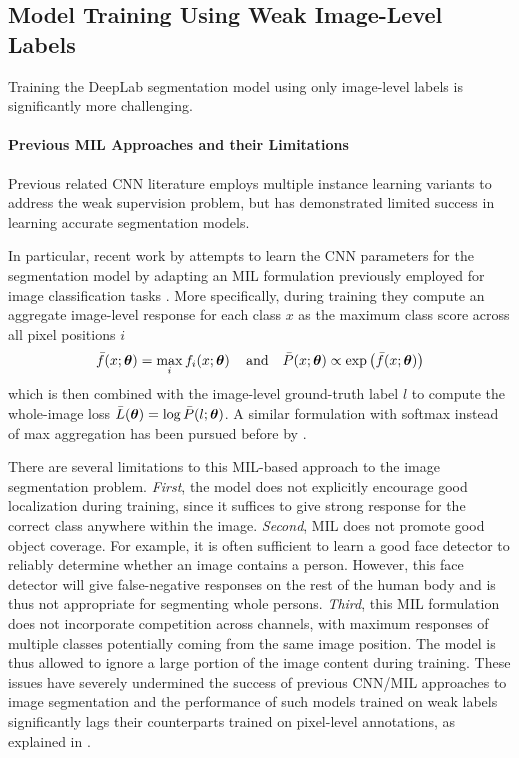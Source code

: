 \subsection{Model Training Using Weak Image-Level Labels}
\label{sec:train_image}

Training the DeepLab segmentation model using only image-level labels
is significantly more challenging.

\paragraph{Previous MIL Approaches and their Limitations}

Previous related CNN literature employs multiple instance learning
variants to address the weak supervision problem, but has demonstrated
limited success in learning accurate segmentation models. 

In particular, recent work by \citet{pathak2014fully} attempts to
learn the CNN parameters for the segmentation model by adapting an MIL
formulation previously employed for image classification tasks
\citep{oquab2014weakly, papandreou2014untangling}. More specifically,
during training they compute an aggregate image-level response for
each class $x$ as the maximum class score across all pixel positions
$i$
\begin{equation}
  \label{eq:mil}
  \bar{f}(x; \boldsymbol{\theta}) = \max_i f_i(x; \boldsymbol{\theta}) \,
  \quad \mathrm{and} \quad
  \bar{P}(x; \boldsymbol{\theta}) \propto \exp \left( \bar{f}(x; \boldsymbol{\theta}) \right)
\end{equation}
which is then combined with the image-level ground-truth label $l$ to
compute the whole-image loss $\bar{L}(\boldsymbol{\theta}) = \log \bar{P}(l;
\boldsymbol{\theta})$. A similar formulation with softmax instead of max
aggregation has been pursued before by \citet{pinheiro2014weakly}.

There are several limitations to this MIL-based approach to the image
segmentation problem. \emph{First}, the model does not explicitly
encourage good localization during training, since it suffices to give
strong response for the correct class anywhere within the
image. \emph{Second}, MIL does not promote good
object coverage. For example, it is often sufficient to learn a good
face detector to reliably determine whether an image contains a
person. However, this face detector will give false-negative
responses on the rest of the human body and is thus not appropriate
for segmenting whole persons. \emph{Third}, this MIL formulation
does not incorporate competition across channels, with maximum
responses of multiple classes potentially coming from the same image
position. The model is thus allowed to ignore a large portion of the
image content during training.
These issues have severely undermined the success of previous CNN/MIL
approaches to image segmentation and the performance of such models
trained on weak labels significantly lags their counterparts trained
on pixel-level annotations, as explained in .

